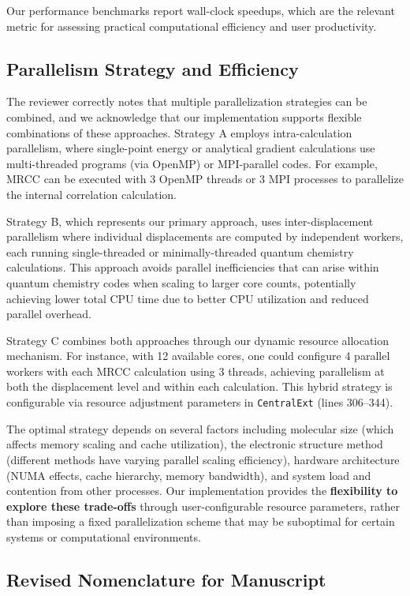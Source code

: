 \documentclass[11pt]{article}
\begin{document}
Our performance benchmarks report wall-clock speedups, which are the relevant metric for assessing practical computational efficiency and user productivity.

\subsection{Parallelism Strategy and Efficiency}

The reviewer correctly notes that multiple parallelization strategies can be combined, and we acknowledge that our implementation supports flexible combinations of these approaches. Strategy A employs intra-calculation parallelism, where single-point energy or analytical gradient calculations use multi-threaded programs (via OpenMP) or MPI-parallel codes. For example, MRCC can be executed with 3 OpenMP threads or 3 MPI processes to parallelize the internal correlation calculation.

Strategy B, which represents our primary approach, uses inter-displacement parallelism where individual displacements are computed by independent workers, each running single-threaded or minimally-threaded quantum chemistry calculations. This approach avoids parallel inefficiencies that can arise within quantum chemistry codes when scaling to larger core counts, potentially achieving lower total CPU time due to better CPU utilization and reduced parallel overhead.

Strategy C combines both approaches through our dynamic resource allocation mechanism. For instance, with 12 available cores, one could configure 4 parallel workers with each MRCC calculation using 3 threads, achieving parallelism at both the displacement level and within each calculation. This hybrid strategy is configurable via resource adjustment parameters in \texttt{CentralExt} (lines 306--344).

The optimal strategy depends on several factors including molecular size (which affects memory scaling and cache utilization), the electronic structure method (different methods have varying parallel scaling efficiency), hardware architecture (NUMA effects, cache hierarchy, memory bandwidth), and system load and contention from other processes. Our implementation provides the \textbf{flexibility to explore these trade-offs} through user-configurable resource parameters, rather than imposing a fixed parallelization scheme that may be suboptimal for certain systems or computational environments.

\subsection{Revised Nomenclature for Manuscript}
\end{document}
